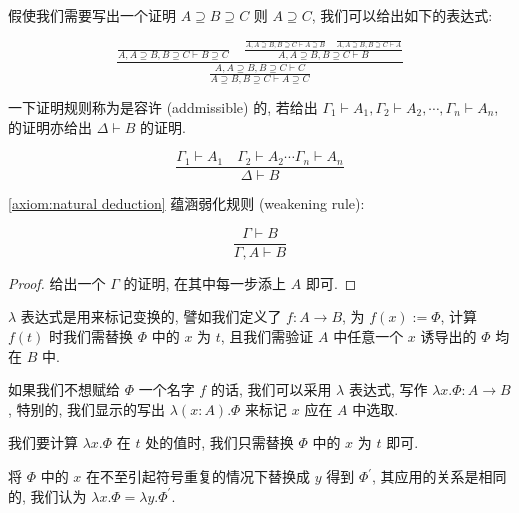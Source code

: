 \begin{example}
    假使我们需要写出一个证明 \(A \supseteq B \supseteq C\) 则 \(A \supseteq C\), 我们可以给出如下的表达式:

    \[
        \frac{\frac{}{A,A \supseteq B,B \supseteq C \vdash B \supseteq C} \quad \frac{\frac{}{A,A \supseteq B,B \supseteq C \vdash A \supseteq B} \quad \frac{}{A,A \supseteq B,B \supseteq C \vdash A}}
        {A,A \supseteq B,B \supseteq C \vdash B}}{\frac{A,A \supseteq B,B \supseteq C \vdash C}{A \supseteq B,B \supseteq C \vdash A \supseteq C}}
    \]
\end{example}

\begin{definition}
    一下证明规则称为是容许 (addmissible) 的, 若给出 \(\Gamma_1 \vdash A_1, \Gamma_2 \vdash A_2, \cdots, \Gamma_n \vdash A_n\),
    的证明亦给出 \(\Delta \vdash B\) 的证明.
    
    \[
        \frac{\Gamma_1 \vdash A_1 \quad \Gamma_2 \vdash A_2 \cdots \Gamma_n \vdash A_n}{\Delta \vdash B}
    \]
\end{definition}

\begin{lemma}
    \ref{axiom:natural deduction} 蕴涵弱化规则 (weakening rule):
    
    \[
        \frac{\Gamma \vdash B}{\Gamma,A \vdash B}
    \]

    \begin{proof}
        给出一个 \(\Gamma\) 的证明, 在其中每一步添上 \(A\) 即可.
    \end{proof}
\end{lemma}

\(\lambda\) 表达式是用来标记变换的, 譬如我们定义了 \(f : A \to B\),
为 \(f(x) := \Phi\), 计算 \(f(t)\) 时我们需替换 \(\Phi\) 中的 \(x\) 为 \(t\),
且我们需验证 \(A\) 中任意一个 \(x\) 诱导出的 \(\Phi\) 均在 \(B\) 中.

\begin{definition}
    如果我们不想赋给 \(\Phi\) 一个名字 \(f\) 的话, 我们可以采用 \(\lambda\) 表达式,
    写作 \(\lambda x.\Phi : A \to B\), 特别的, 我们显示的写出 \(\lambda (x:A). \Phi\) 来标记
    \(x\) 应在 \(A\) 中选取.

    我们要计算 \(\lambda x.\Phi\) 在 \(t\) 处的值时, 我们只需替换 \(\Phi\) 中的 \(x\) 为 \(t\) 即可.
\end{definition}

\begin{definition}
    将 \(\Phi\) 中的 \(x\) 在不至引起符号重复的情况下替换成 \(y\) 得到 \(\Phi^\prime\),
    其应用的关系是相同的, 我们认为 \(\lambda x.\Phi = \lambda y.\Phi^\prime\).
\end{definition}

